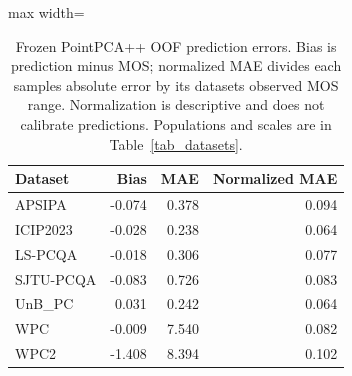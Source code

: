 \begin{table}[t!]
\centering
\caption{Frozen PointPCA++ OOF prediction errors. Bias is prediction minus MOS; normalized MAE divides each sample\textquotesingle s absolute error by its dataset\textquotesingle s observed MOS range. Normalization is descriptive and does not calibrate predictions. Populations and scales are in Table~\ref{tab_datasets}.}
\label{tab_review_error_summary}
\scriptsize
\begin{adjustbox}{max width=\textwidth}
\begin{tabular}{lrrr}
\toprule
Dataset & Bias & MAE & Normalized MAE \\
\midrule
APSIPA & -0.074 & 0.378 & 0.094 \\
ICIP2023 & -0.028 & 0.238 & 0.064 \\
LS-PCQA & -0.018 & 0.306 & 0.077 \\
SJTU-PCQA & -0.083 & 0.726 & 0.083 \\
UnB\_PC & 0.031 & 0.242 & 0.064 \\
WPC & -0.009 & 7.540 & 0.082 \\
WPC2 & -1.408 & 8.394 & 0.102 \\
\bottomrule
\end{tabular}
\end{adjustbox}
\end{table}
